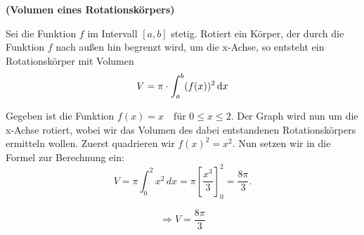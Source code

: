 \documentclass[ngerman, 12pt]{nssheetxea}
\begin{document}

\begin{theorem} \textbf{(Volumen eines Rotationskörpers)} \par
Sei die Funktion $f$ im Intervall $[a,b]$ stetig. Rotiert ein Körper, der durch die Funktion $f$ nach außen hin begrenzt wird, um die x-Achse, so entsteht ein Rotationskörper mit Volumen
\[ V=\pi \cdot \int_a^b(f(x))^2 \mathop{}\!\mathrm{d} x\]
\label{Satz:Vol_RotK}
\end{theorem}

\begin{example}
Gegeben ist die Funktion
$f(x)=x \quad \text{für } 0 \le x \le 2.$
Der Graph wird nun um die x-Achse rotiert, wobei wir das Volumen des dabei entstandenen Rotationskörpers ermitteln wollen. Zuerst quadrieren wir $f(x)^2=x^2$. Nun setzen wir in die Formel zur Berechnung ein:
\[
V=\pi \int_0^2 x^2\,dx
=\pi\left[\frac{x^3}{3}\right]_0^2
=\frac{8\pi}{3}.
\]

\[
\Rightarrow V=\frac{8\pi}{3}
\]

\begin{center}
\end{center}
\end{example}
\end{document}
